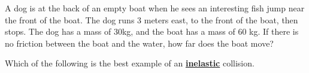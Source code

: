 \documentclass[10pt]{examdesign}
\begin{document}
\begin{multiplechoice} [title={Multiple Choice (3 Points Each)},
	rearrange=No]
\begin{question}
\end{question}



\begin{question}
	A dog is at the back of an empty boat when he sees an interesting fish jump near the front of the boat.  The dog runs 3 meters east, to the front of the boat, then stops.  The dog has a mass of 30kg, and the boat has a mass of 60 kg.  If there is no friction between the boat and the water, how far does the boat move? 

\end{question}


	\begin{question}
	Which of the following is the best example of an \textbf{\underline{inelastic}} collision.
\end{question}

\end{multiplechoice}
\end{document}
